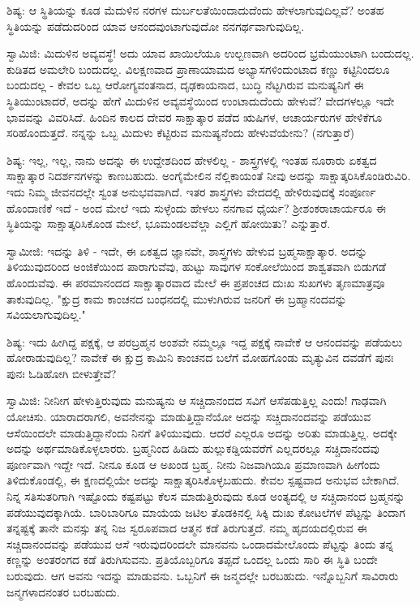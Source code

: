 ಶಿಷ್ಯ: ಆ ಸ್ಥಿತಿಯನ್ನು ಕೂಡ ಮೆದುಳಿನ ನರಗಳ ದುರ್ಬಲತೆಯಿಂದಾದುದೆಂದು ಹೇಳಲಾಗುವುದಿಲ್ಲವೆ? ಅಂತಹ ಸ್ಥಿತಿಯನ್ನು ಪಡೆದುದರಿಂದ ಯಾವ ಆನಂದವುಂಟಾಗುವುದೋ ನನಗರ್ಥವಾಗುವುದಿಲ್ಲ.

ಸ್ವಾಮಿಜಿ: ಮಿದುಳಿನ ಅವ್ಯವಸ್ಥೆ! ಅದು ಯಾವ ಖಾಯಿಲೆಯೂ ಉಲ್ಬಣವಾಗಿ ಅದರಿಂದ ಭ್ರಮೆಯುಂಟಾಗಿ ಬಂದುದಲ್ಲ. ಕುಡಿತದ ಅಮಲೇರಿ ಬಂದುದಲ್ಲ. ವಿಲಕ್ಷಣವಾದ ಪ್ರಾಣಾಯಾಮದ ಅಭ್ಯಾಸಗಳಿಂದುಂಟಾದ ಕಣ್ಣು ಕಟ್ಟಿನಿಂದಲೂ ಬಂದುದಲ್ಲ - ಕೇವಲ ಒಬ್ಬ ಆರೋಗ್ಯವಂತನಾದ, ದೃಢಕಾಯನಾದ, ಬುದ್ಧಿ ನೆಟ್ಟಗಿರುವ ಮನುಷ್ಯನಿಗೆ ಈ ಸ್ಥಿತಿಯುಂಟಾದರೆ, ಅದನ್ನು ಹೇಗೆ ಮಿದುಳಿನ ಅವ್ಯವಸ್ಥೆಯಿಂದ ಉಂಟಾದುದೆಂದು ಹೇಳುವೆ? ವೇದಗಳಲ್ಲೂ ಇದೇ ಭಾವವನ್ನು ವಿವರಿಸಿದೆ. ಹಿಂದಿನ ಕಾಲದ ದೇವರ ಸಾಕ್ಷಾತ್ಕಾರ ಪಡೆದ ಋಷಿಗಳ, ಆಚಾರ್ಯರುಗಳ ಹೇಳಿಕೆಗೂ ಸರಿಹೊಂದುತ್ತದೆ. ನನ್ನನ್ನು ಒಬ್ಬ ಮಿದುಳು ಕೆಟ್ಟಿರುವ ಮನುಷ್ಯನೆಂದು ಹೇಳುವೆಯೇನು? (ನಗುತ್ತಾರೆ)

ಶಿಷ್ಯ: ಇಲ್ಲ, ಇಲ್ಲ, ನಾನು ಅದನ್ನು ಈ ಉದ್ದೇಶದಿಂದ ಹೇಳಲಿಲ್ಲ - ಶಾಸ್ತ್ರಗಳಲ್ಲಿ ಇಂತಹ ನೂರಾರು ಏಕತ್ವದ ಸಾಕ್ಷಾತ್ಕಾರ ನಿದರ್ಶನಗಳನ್ನು ಕಾಣಬಹುದು. ಅಂಗೈಮೇಲಿನ ನೆಲ್ಲಿಕಾಯಂತೆ ನೀವು ಅದನ್ನು ಸಾಕ್ಷಾತ್ಕರಿಸಿಕೊಂಡಿರುವಿರಿ. ಇದು ನಿಮ್ಮ ಜೀವನದಲ್ಲೇ ಸ್ವಂತ ಅನುಭವವಾಗಿದೆ. ಇತರ ಶಾಸ್ತ್ರಗಳು ವೇದದಲ್ಲಿ ಹೇಳಿರುವುದಕ್ಕೆ ಸಂಪೂರ್ಣ ಹೊಂದಾಣಿಕೆ ಇದೆ - ಅಂದ ಮೇಲೆ ಇದು ಸುಳ್ಳೆಂದು ಹೇಳಲು ನನಗಾವ ಧೈರ್ಯ? ಶ‍್ರೀಶಂಕರಾಚಾರ್ಯರೂ ಈ ಸ್ಥಿತಿಯನ್ನು ಸಾಕ್ಷಾತ್ಕರಿಸಿಕೊಂಡ ಮೇಲೆ, ಭೂಮಂಡಲವೆಲ್ಲಾ ಎಲ್ಲಿಗೆ ಹೋಯಿತು? ಎನ್ನುತ್ತಾರೆ.

ಸ್ವಾಮೀಜಿ: ಇದನ್ನು ತಿಳಿ - ಇದೇ, ಈ ಏಕತ್ವದ ಜ್ಞಾನವೇ, ಶಾಸ್ತ್ರಗಳು ಹೇಳುವ ಬ್ರಹ್ಮಸಾಕ್ಷಾತ್ಕಾರ. ಅದನ್ನು ತಿಳಿಯುವುದರಿಂದ ಅಂಜಿಕೆಯಿಂದ ಪಾರಾಗುವೆವು, ಹುಟ್ಟು ಸಾವುಗಳ ಸಂಕೋಲೆಯಿಂದ ಶಾಶ್ವತವಾಗಿ ಬಿಡುಗಡೆ ಹೊಂದುವೆವು. ಈ ಪರಮಾನಂದದ ಸಾಕ್ಷಾತ್ಕಾರವಾದ ಮೇಲೆ ಈ ಪ್ರಪಂಚದ ದುಃಖ ಸುಖಗಳು ತೃಣಮಾತ್ರವೂ ತಾಕುವುದಿಲ್ಲ. "ಕ್ಷುದ್ರ ಕಾಮ ಕಾಂಚನದ ಬಂಧನದಲ್ಲಿ ಮುಳುಗಿರುವ ಜನರಿಗೆ ಈ ಬ್ರಹ್ಮಾನಂದವನ್ನು ಸವಿಯಲಾಗುವುದಿಲ್ಲ."

ಶಿಷ್ಯ: ಇದು ಹೀಗಿದ್ದ ಪಕ್ಷಕ್ಕೆ, ಆ ಪರಬ್ರಹ್ಮನ ಅಂಶವೇ ನಮ್ಮಲ್ಲೂ ಇದ್ದ ಪಕ್ಷಕ್ಕೆ ನಾವೇಕೆ ಆ ಆನಂದವನ್ನು ಪಡೆಯಲು ಹೋರಾಡುವುದಿಲ್ಲ? ನಾವೇಕೆ ಈ ಕ್ಷುದ್ರ ಕಾಮಿನಿ ಕಾಂಚನದ ಬಲೆಗೆ ಮೋಹಗೊಂಡು ಮೃತ್ಯುವಿನ ದವಡೆಗೆ ಪುನಃ ಪುನಃ ಓಡಿಹೋಗಿ ಬೀಳುತ್ತೇವೆ?

ಸ್ವಾಮಿಜಿ: ನೀನೀಗ ಹೇಳುತ್ತಿರುವುದು ಮನುಷ್ಯನು ಆ ಸಚ್ಚಿದಾನಂದದ ಸವಿಗೆ ಆಸೆಪಡುತ್ತಿಲ್ಲ ಎಂದು! ಗಾಢವಾಗಿ ಯೋಚಿಸು. ಯಾರಾದರಾಗಲಿ, ಅವನೇನನ್ನು ಮಾಡುತ್ತಿದ್ದಾನೆಯೋ ಅದನ್ನು ಸಚ್ಚಿದಾನಂದವನ್ನು ಪಡೆಯುವ ಆಸೆಯಿಂದಲೇ ಮಾಡುತ್ತಿದ್ದಾನೆಂದು ನಿನಗೆ ತಿಳಿಯುವುದು. ಆದರೆ ಎಲ್ಲರೂ ಅದನ್ನು ಅರಿತು ಮಾಡುತ್ತಿಲ್ಲ. ಅದಕ್ಕೇ ಅದನ್ನು ಅರ್ಥಮಾಡಿಕೊಳ್ಳಲಾರರು. ಬ್ರಹ್ಮನಿಂದ ಹಿಡಿದು ಹುಲ್ಲುಕಡ್ಡಿಯವರೆಗೆ ಎಲ್ಲದರಲ್ಲೂ ಸಚ್ಚಿದಾನಂದವು ಪೂರ್ಣವಾಗಿ ಇದ್ದೇ ಇದೆ. ನೀನೂ ಕೂಡ ಆ ಅಖಂಡ ಬ್ರಹ್ಮ. ನೀನು ನಿಜವಾಗಿಯೂ ಪ್ರಮಾಣವಾಗಿ ಹೀಗೆಂದು ತಿಳಿದುಕೊಂಡಲ್ಲಿ, ಈ ಕ್ಷಣದಲ್ಲಿಯೇ ಅದನ್ನು ಸಾಕ್ಷಾತ್ಕರಿಸಿಕೊಳ್ಳಬಹುದು. ಕೇವಲ ಸ್ಪಷ್ಟವಾದ ಅನುಭವ ಬೇಕಾಗಿದೆ. ನಿನ್ನ ಸತಿಸುತರಿಗಾಗಿ ಇಷ್ಟೊಂದು ಕಷ್ಟಪಟ್ಟು ಕೆಲಸ ಮಾಡುತ್ತಿರುವುದು ಕೂಡ ಅಂತ್ಯದಲ್ಲಿ ಆ ಸಚ್ಚಿದಾನಂದ ಬ್ರಹ್ಮನನ್ನು ಪಡೆಯುವುದಕ್ಕಾಗಿಯೆ. ಬಾರಿಬಾರಿಗೂ ಮಾಯೆಯ ಜಟಿಲ ತೊಡಕಿನಲ್ಲಿ ಸಿಕ್ಕಿ ದುಃಖ ಕೋಟಲೆಗಳ ಪೆಟ್ಟನ್ನು ತಿಂದಾಗ ತನ್ನಷ್ಟಕ್ಕೆ ತಾನೇ ಮನಸ್ಸು ತನ್ನ ನಿಜ ಸ್ವರೂಪವಾದ ಆತ್ಮನ ಕಡೆ ತಿರುಗುತ್ತದೆ. ನಮ್ಮ ಹೃದಯದಲ್ಲಿರುವ ಈ ಸಚ್ಚಿದಾನಂದವನ್ನು ಪಡೆಯುವ ಆಸೆ ಇರುವುದರಿಂದಲೇ ಮಾನವನು ಒಂದಾದಮೇಲೊಂದು ಪೆಟ್ಟನ್ನು ತಿಂದು ತನ್ನ ಕಣ್ಣನ್ನು ಅಂತರಂಗದ ಕಡೆ ತಿರುಗಿಸುವನು. ಪ್ರತಿಯೊಬ್ಬರಿಗೂ ತಪ್ಪದೆ ಒಂದಲ್ಲ ಒಂದು ಸಾರಿ ಈ ಸ್ಥಿತಿ ಬಂದೇ ಬರುವುದು. ಆಗ ಅವನು ಇದನ್ನು ಮಾಡುವನು. ಒಬ್ಬನಿಗೆ ಈ ಜನ್ಮದಲ್ಲೇ ಬರಬಹುದು. ಇನ್ನೊಬ್ಬನಿಗೆ ಸಾವಿರಾರು ಜನ್ಮಗಳಾದನಂತರ ಬರಬಹುದು.

